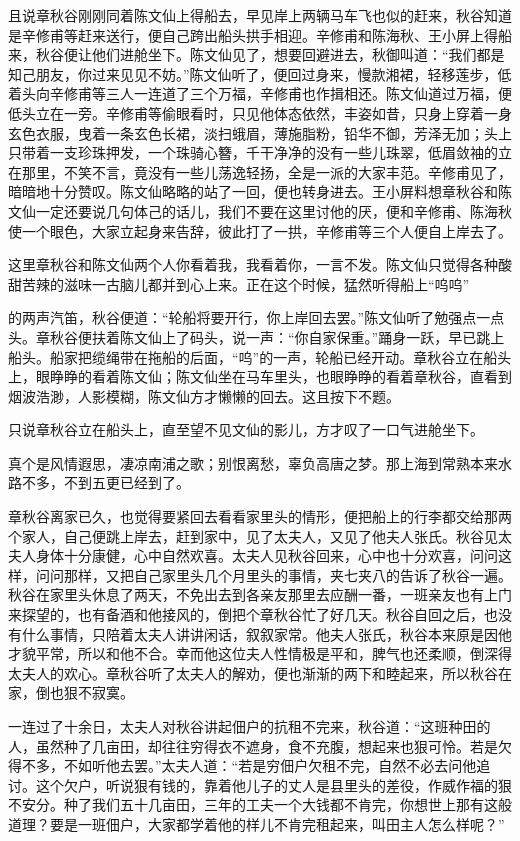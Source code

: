 \documentclass[12pt,UTF8]{ctexbook}
\begin{document}
{{{且说章秋谷刚刚同着陈文仙上得船去，早见岸上两辆马车飞也似的赶来，秋谷知道是辛修甫等赶来送行，便自己跨出船头拱手相迎。辛修甫和陈海秋、王小屏上得船来，秋谷便让他们进舱坐下。陈文仙见了，想要回避进去，秋御叫道：“我们都是知己朋友，你过来见见不妨。”陈文仙听了，便回过身来，慢款湘裙，轻移莲步，低着头向辛修甫等三人一连道了三个万福，辛修甫也作揖相还。陈文仙道过万福，便低头立在一旁。辛修甫等偷眼看时，只见他体态依然，丰姿如昔，只身上穿着一身玄色衣服，曳着一条玄色长裙，淡扫蛾眉，薄施脂粉，铅华不御，芳泽无加；头上只带着一支珍珠押发，一个珠骑心簪，千干净净的没有一些儿珠翠，低眉敛袖的立在那里，不笑不言，竟没有一些儿荡逸轻扬，全是一派的大家丰范。辛修甫见了，暗暗地十分赞叹。陈文仙略略的站了一回，便也转身进去。王小屏料想章秋谷和陈文仙一定还要说几句体己的话儿，我们不要在这里讨他的厌，便和辛修甫、陈海秋使一个眼色，大家立起身来告辞，彼此打了一拱，辛修甫等三个人便自上岸去了。

这里章秋谷和陈文仙两个人你看着我，我看着你，一言不发。陈文仙只觉得各种酸甜苦辣的滋味一古脑儿都并到心上来。正在这个时候，猛然听得船上“呜呜”

的两声汽笛，秋谷便道：“轮船将要开行，你上岸回去罢。”陈文仙听了勉强点一点头。章秋谷便扶着陈文仙上了码头，说一声：“你自家保重。”踊身一跃，早已跳上船头。船家把缆绳带在拖船的后面，“呜”的一声，轮船已经开动。章秋谷立在船头上，眼睁睁的看着陈文仙；陈文仙坐在马车里头，也眼睁睁的看着章秋谷，直看到烟波浩渺，人影模糊，陈文仙方才懒懒的回去。这且按下不题。

只说章秋谷立在船头上，直至望不见文仙的影儿，方才叹了一口气进舱坐下。

真个是风情遐思，凄凉南浦之歌；别恨离愁，辜负高唐之梦。那上海到常熟本来水路不多，不到五更已经到了。

章秋谷离家已久，也觉得要紧回去看看家里头的情形，便把船上的行李都交给那两个家人，自己便跳上岸去，赶到家中，见了太夫人，又见了他夫人张氏。秋谷见太夫人身体十分康健，心中自然欢喜。太夫人见秋谷回来，心中也十分欢喜，问问这样，问问那样，又把自己家里头几个月里头的事情，夹七夹八的告诉了秋谷一遍。秋谷在家里头休息了两天，不免出去到各亲友那里去应酬一番，一班亲友也有上门来探望的，也有备酒和他接风的，倒把个章秋谷忙了好几天。秋谷自回之后，也没有什么事情，只陪着太夫人讲讲闲话，叙叙家常。他夫人张氏，秋谷本来原是因他才貌平常，所以和他不合。幸而他这位夫人性情极是平和，脾气也还柔顺，倒深得太夫人的欢心。章秋谷听了太夫人的解劝，便也渐渐的两下和睦起来，所以秋谷在家，倒也狠不寂寞。

一连过了十余日，太夫人对秋谷讲起佃户的抗租不完来，秋谷道：“这班种田的人，虽然种了几亩田，却往往穷得衣不遮身，食不充腹，想起来也狠可怜。若是欠得不多，不如听他去罢。”太夫人道：“若是穷佃户欠租不完，自然不必去问他追讨。这个欠户，听说狠有钱的，靠着他儿子的丈人是县里头的差役，作威作福的狠不安分。种了我们五十几亩田，三年的工夫一个大钱都不肯完，你想世上那有这般道理？要是一班佃户，大家都学着他的样儿不肯完租起来，叫田主人怎么样呢？”

}}}
\end{document}
